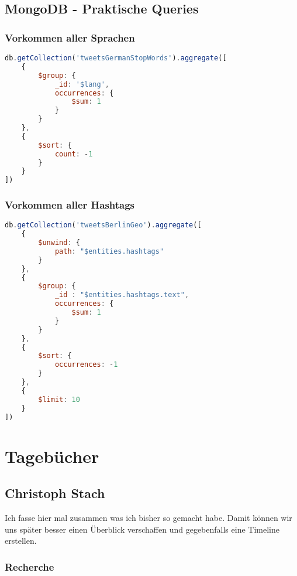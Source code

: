 \documentclass[12pt, 
	a4paper, 
	oneside, 
	leqno]{scrreprt}
\begin{document}
\section{MongoDB - Praktische Queries}

\subsection{Vorkommen aller Sprachen}
\begin{lstlisting}[language=JavaScript]
db.getCollection('tweetsGermanStopWords').aggregate([
    { 
        $group: { 
            _id: '$lang',
            occurrences: {
                $sum: 1
            }
        }
    },
    {
        $sort: {
            count: -1
        }
    }
])
\end{lstlisting}

\subsection{Vorkommen aller Hashtags}
\begin{lstlisting}[language=JavaScript]
db.getCollection('tweetsBerlinGeo').aggregate([  
    { 
        $unwind: {
            path: "$entities.hashtags"
        }
    },
    { 
        $group: { 
            _id : "$entities.hashtags.text",
            occurrences: {
                $sum: 1
            }
        }
    },
    {
        $sort: {
            occurrences: -1 
        }
    },
    {
        $limit: 10
    }
])
\end{lstlisting}

\chapter{Tagebücher}

\section{Christoph Stach}

Ich fasse hier mal zusammen was ich bisher so gemacht habe.
Damit können wir uns später besser einen Überblick verschaffen und gegebenfalls eine Timeline erstellen.

\subsection*{Recherche}
\end{document}
